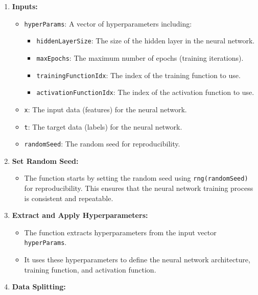 \documentclass[
]{agujournal2019}
\providecommand{\tightlist}{%
  \setlength{\itemsep}{0pt}\setlength{\parskip}{0pt}}\usepackage{longtable,booktabs,array}
\begin{document}
\begin{enumerate}
\def\labelenumi{\arabic{enumi}.}
\tightlist
\item
  \textbf{Inputs:}

  \begin{itemize}
  \tightlist
  \item
    \texttt{hyperParams}: A vector of hyperparameters including:

    \begin{itemize}
    \tightlist
    \item
      \texttt{hiddenLayerSize}: The size of the hidden layer in the
      neural network.
    \item
      \texttt{maxEpochs}: The maximum number of epochs (training
      iterations).
    \item
      \texttt{trainingFunctionIdx}: The index of the training function
      to use.
    \item
      \texttt{activationFunctionIdx}: The index of the activation
      function to use.
    \end{itemize}
  \item
    \texttt{x}: The input data (features) for the neural network.
  \item
    \texttt{t}: The target data (labels) for the neural network.
  \item
    \texttt{randomSeed}: The random seed for reproducibility.
  \end{itemize}
\item
  \textbf{Set Random Seed:}

  \begin{itemize}
  \tightlist
  \item
    The function starts by setting the random seed using
    \texttt{rng(randomSeed)} for reproducibility. This ensures that the
    neural network training process is consistent and repeatable.
  \end{itemize}
\item
  \textbf{Extract and Apply Hyperparameters:}

  \begin{itemize}
  \tightlist
  \item
    The function extracts hyperparameters from the input vector
    \texttt{hyperParams}.
  \item
    It uses these hyperparameters to define the neural network
    architecture, training function, and activation function.
  \end{itemize}
\item
  \textbf{Data Splitting:}


\end{enumerate}
\end{document}
